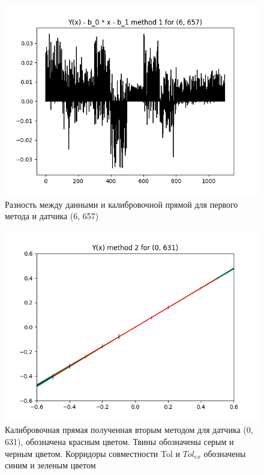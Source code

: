 \begin{figure}[H]
    \centering
    \includegraphics[width=0.7\linewidth]{image/6_657_method_1_difference.png}
    \caption{ Разность между данными и калибровочной прямой для первого метода и датчика (6, 657)}
    \label{fig:6_657_method_1_difference}
\end{figure}

\begin{figure}[H]
    \centering
    \includegraphics[width=0.7\linewidth]{image/0_631_method_2_corridor_joint_dependence.png}
    \caption{Калибровочная прямая полученная вторым методом для датчика (0, 631), обозначена красным цветом. Твины обозначены серым и черным цветом. Корридоры совместности Tol и $Tol_{ex}$ обозначены синим и зеленым цветом}
    \label{fig:0_631_method_2}
\end{figure}

